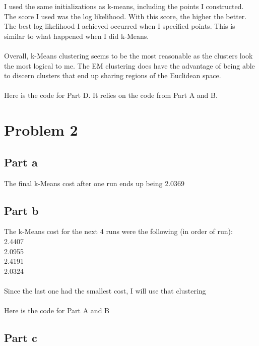 \documentclass[twoside,11pt]{article}
\theoremstyle{definition}
\begin{document}
I used the same initializations as k-means, including the points I constructed. The score I used was the log likelihood. With this score, the higher the better. The best log likelihood I achieved occurred when I specified points. This is similar to what happened when I did k-Means. \\
\\
Overall, k-Means clustering seems to be the most reasonable as the clusters look the most logical to me. The EM clustering does have the advantage of being able to discern clusters that end up sharing regions of the Euclidean space. \\
\\
Here is the code for Part D. It relies on the code from Part A and B.


\newpage

\section*{Problem 2}

\subsection*{Part a}

The final k-Means cost after one run ends up being 2.0369

\subsection*{Part b}

The k-Means cost for the next 4 runs were the following (in order of run):\\
2.4407\\
2.0955\\
2.4191\\
2.0324\\
\\
Since the last one had the smallest cost, I will use that clustering\\
\\
Here is the code for Part A and B\\

\newpage

\subsection*{Part c}
\end{document}
